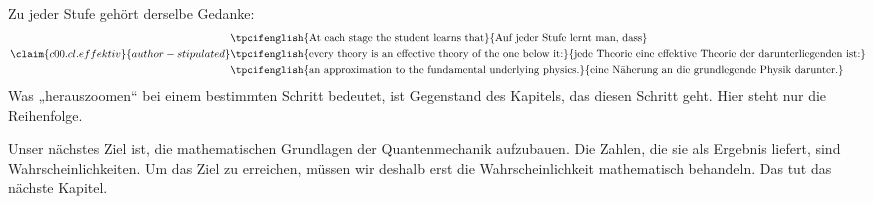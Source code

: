 Zu jeder Stufe gehört derselbe Gedanke:
\begin{equation}\label{c00.eq.effektiv}\claim{c00.cl.effektiv}{author-stipulated}
  \begin{aligned}
    &\text{\tpcifenglish{At each stage the student learns that}{Auf jeder Stufe lernt man, dass}} \\
    &\text{\tpcifenglish{every theory is an effective theory of the one below it:}{jede Theorie eine effektive Theorie der darunterliegenden ist:}} \\
    &\text{\tpcifenglish{an approximation to the fundamental underlying physics.}{eine Näherung an die grundlegende Physik darunter.}}
  \end{aligned}
\end{equation}
Was „herauszoomen“ bei einem bestimmten Schritt bedeutet, ist Gegenstand des Kapitels, das
diesen Schritt geht. Hier steht nur die Reihenfolge.

Unser nächstes Ziel ist, die mathematischen Grundlagen der Quantenmechanik aufzubauen. Die
Zahlen, die sie als Ergebnis liefert, sind Wahrscheinlichkeiten. Um das Ziel zu erreichen,
müssen wir deshalb erst die Wahrscheinlichkeit mathematisch behandeln. Das tut das nächste
Kapitel.
